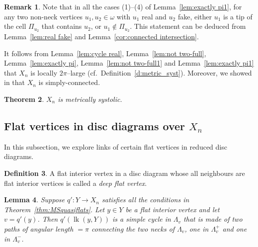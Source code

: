 \documentclass[11pt]{amsart}
\newcommand{\lk}{\operatorname{lk}}
\newtheorem{theorem}{Theorem}[section]
\newtheorem{lemma}[theorem]{Lemma}
\theoremstyle{definition}
\newtheorem{definition}[theorem]{Definition}
\newtheorem{remark}[theorem]{Remark}
\newcommand{\lemsixthree}{Lemma 6.4}
\begin{document}
\begin{remark}
	\label{rmk:non tip}
Note that in all the cases (1)--(4) of Lemma~\ref{lem:exactly pi1}, for any two non-neck vertices $u_1,u_2\in\omega$ with $u_1$ real and $u_2$ fake, either $u_1$ is a tip of the cell $\Pi_{u_2}$ that contains $u_2$, or $u_1\notin \Pi_{u_2}$. This statement can be deduced from Lemma~\ref{lem:real fake} and Lemma~\ref{cor:connected intersection}.
\end{remark}

It follows from Lemma~\ref{lem:cycle real}, Lemma~\ref{lem:not two-full}, Lemma~\ref{lem:exactly pi}, Lemma~\ref{lem:not two-full1} and Lemma~\ref{lem:exactly pi1} that $X_n$ is locally $2\pi$--large (cf.\ Definition~\ref{d:metric_syst}). Moreover, we showed in \cite[\lemsixthree]{Artinmetric} that $X_n$ is simply-connected. 

\begin{theorem}
	\label{thm:X_n}
$X_n$ is metrically systolic.
\end{theorem}
\subsection{Flat vertices in disc diagrams over $X_n$}
In this subsection, we explore links of certain flat vertices in reduced disc diagrams. 
\begin{definition}
	A flat interior vertex in a disc diagram whose all neighbours are flat interior vertices is called
	a \emph{deep flat vertex}.
\end{definition}

\begin{lemma}
	\label{lem:flat vertex}
	Suppose $q'\colon Y\to X_n$ satisfies all the conditions in Theorem~\ref{thm:MSquasiflats}. Let $y\in Y$ be a flat interior vertex and let $v=q'(y)$. Then $q'(\lk(y,Y))$ is a simple cycle in $\Lambda_v$ that is made of two paths of angular length $=\pi$ connecting the two necks of $\Lambda_v$, one in $\Lambda^+_v$ and one in $\Lambda^-_v$.
\end{lemma}
\end{document}
